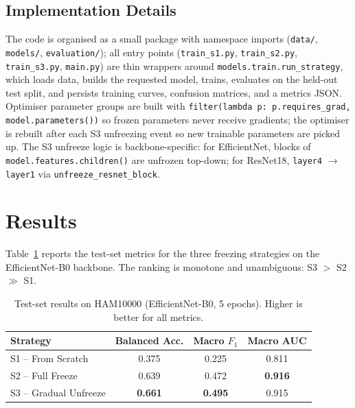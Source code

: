 \documentclass{article}
\begin{document}
\subsection{Implementation Details}

The code is organised as a small package with namespace imports
(\texttt{data/}, \texttt{models/}, \texttt{evaluation/}); all entry points
(\texttt{train\_s1.py}, \texttt{train\_s2.py}, \texttt{train\_s3.py},
\texttt{main.py}) are thin wrappers around
\texttt{models.train.run\_strategy}, which loads data, builds the requested
model, trains, evaluates on the held-out test split, and persists training
curves, confusion matrices, and a metrics JSON. Optimiser parameter groups
are built with \texttt{filter(lambda p: p.requires\_grad,
model.parameters())} so frozen parameters never receive gradients; the
optimiser is rebuilt after each S3 unfreezing event so new trainable
parameters are picked up. The S3 unfreeze logic is backbone-specific: for
EfficientNet, blocks of \texttt{model.features.children()} are unfrozen
top-down; for ResNet18, \texttt{layer4} $\to$ \texttt{layer1} via
\texttt{unfreeze\_resnet\_block}.

\section{Results}

Table~\ref{tab:results-enet} reports the test-set metrics for the three
freezing strategies on the EfficientNet-B0 backbone. The ranking is monotone
and unambiguous: S3 $>$ S2 $\gg$ S1.

\begin{table}[h]
\centering
\caption{Test-set results on HAM10000 (EfficientNet-B0, 5 epochs).
Higher is better for all metrics.}
\label{tab:results-enet}
\begin{tabular}{lccc}
\toprule
Strategy & Balanced Acc. & Macro $F_1$ & Macro AUC \\
\midrule
S1 -- From Scratch       & 0.375 & 0.225 & 0.811 \\
S2 -- Full Freeze        & 0.639 & 0.472 & \textbf{0.916} \\
S3 -- Gradual Unfreeze   & \textbf{0.661} & \textbf{0.495} & 0.915 \\
\bottomrule
\end{tabular}
\end{table}
\end{document}
